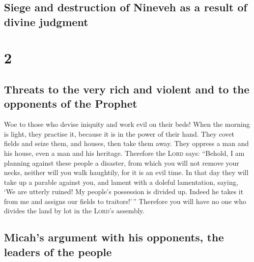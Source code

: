 \hypertarget{siege-and-destruction-of-nineveh-as-a-result-of-divine-judgment}{%
\subsection{Siege and destruction of Nineveh as a result of divine
judgment}\label{siege-and-destruction-of-nineveh-as-a-result-of-divine-judgment}}

\hypertarget{section-1}{%
\section{2}\label{section-1}}

\hypertarget{threats-to-the-very-rich-and-violent-and-to-the-opponents-of-the-prophet}{%
\subsection{Threats to the very rich and violent and to the opponents of
the
Prophet}\label{threats-to-the-very-rich-and-violent-and-to-the-opponents-of-the-prophet}}

 Woe to those who devise iniquity and work evil on their
beds! When the morning is light, they practise it, because it is in the
power of their hand.  They covet fields and seize them,
and houses, then take them away. They oppress a man and his house, even
a man and his heritage.  Therefore the \textsc{Lord} says:
``Behold, I am planning against these people a disaster, from which you
will not remove your necks, neither will you walk haughtily, for it is
an evil time.  In that day they will take up a parable
against you, and lament with a doleful lamentation, saying, `We are
utterly ruined! My people's possession is divided up. Indeed he takes it
from me and assigns our fields to traitors!'\,'' 
Therefore you will have no one who divides the land by lot in the
\textsc{Lord}'s assembly.

\hypertarget{micahs-argument-with-his-opponents-the-leaders-of-the-people}{%
\subsection{Micah's argument with his opponents, the leaders of the
people}\label{micahs-argument-with-his-opponents-the-leaders-of-the-people}}

